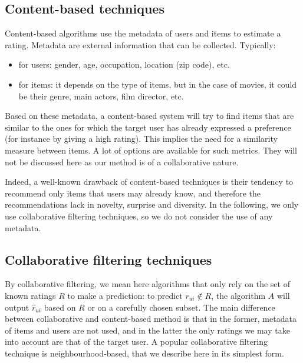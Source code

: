 \subsection{Content-based techniques}

Content-based algorithms use the metadata of users and items to estimate a
rating. Metadata are external information that can be collected. Typically:
\begin{itemize}
\item  for users: gender, age, occupation, location (zip code), etc.
\item for items: it depends on the type of items, but in the case of movies, it
could be their genre, main actors, film director, etc.  \end{itemize}
 
Based on these metadata, a content-based system will try to find items that are
similar to the ones for which the target user has already expressed a
preference (for instance by giving a high rating). This implies the need for a
similarity measure between items.  A lot of options are available for such
metrics. They will not be discussed here as our method is of a collaborative
nature. 

Indeed, a well-known drawback of content-based techniques is their tendency to
recommend only items that users may already know, and therefore the
recommendations lack in novelty, surprise and diversity. In the following, we
only use collaborative filtering techniques, so we do not consider the use of
any metadata.

\subsection{Collaborative filtering techniques}
\label{CollabFil}
By collaborative filtering, we mean here algorithms that only rely on the set
of known ratings $R$ to make a prediction: to predict $r_{ui} \notin R$, the
algorithm $A$ will output $\hat{r}_{ui}$ based on $R$ or on a carefully chosen
subset.  The main difference between collaborative and content-based method is
that in the former, metadata of items and users are not used, and in the latter
the only ratings we may take into account are that of the target user.  A
popular collaborative filtering technique is neighbourhood-based, that we
describe here in its simplest form.

